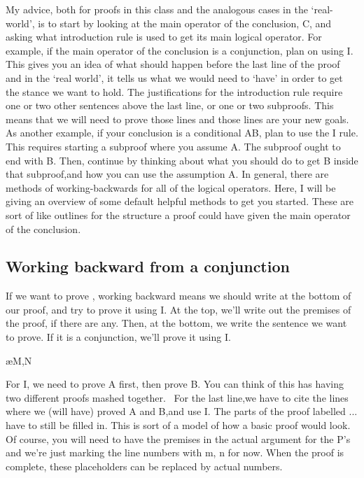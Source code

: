 My advice, both for proofs in this class and the analogous cases in the `real-world', is to start by looking at the main operator of the conclusion, C, and asking what introduction rule is used to get its main logical operator. For example, if the main operator of the conclusion is a conjunction, plan on using \eand I. This gives you an idea of what should happen before the last line of the proof and in the `real world', it tells us what we would need to `have' in order to get the stance we want to hold. The justifications for the introduction rule require one or two other sentences above the last line, or one or two subproofs. This means that we will need to prove those lines and those lines are your new goals. As another example, if your conclusion is a conditional A\eif B, plan to use the \eif I rule. This requires starting a subproof where you assume A. The subproof ought to end with B. Then, continue by thinking about what you should do to get B inside that subproof,and how you can use the assumption A. In general, there are methods of working-backwards for all of the logical operators. Here, I will be giving an overview of some default helpful methods to get you started. These are sort of like outlines for the structure a proof could have given the main operator of the conclusion.

\subsection{Working backward from a conjunction}

If we want to prove \eand {}, working backward means we should write \eand {} at the bottom of our proof, and try to prove it using \eand I. At the top, we’ll write out the premises of the proof, if there are any. Then, at the bottom, we write the sentence we want to prove. If it is a conjunction, we’ll prove it using \eand I.
\begin{fitchproof}
\ellipsesline
{}			
\ellipsesline
{}			
\ellipsesline
{}			
\ae{M,N}	
\end{fitchproof}
For \eand I, we need to prove A first, then prove B. You can think of this has having two different proofs mashed together.  For the last line,we have to cite the lines where we (will have) proved A and B,and use \eand I. The parts of the proof labelled ... have to still be filled in. This is sort of a model of how a basic proof would look. Of course, you will need to have the premises in the actual argument for the P's and we're just marking the line numbers with m, n for now. When the proof is complete, these placeholders can be replaced by actual numbers.

